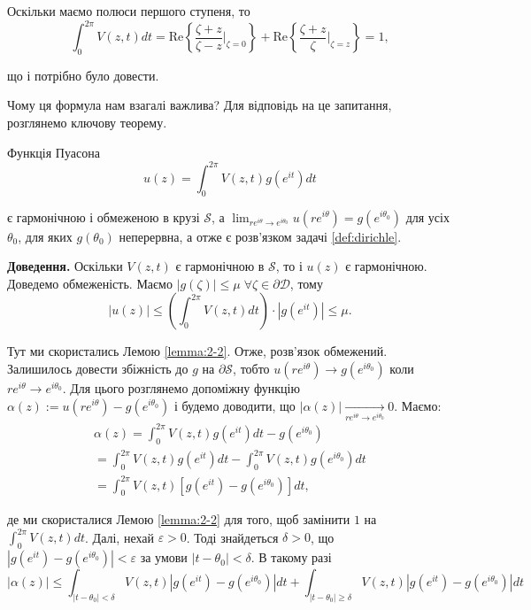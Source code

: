 \documentclass[14pt]{extarticle}
\newcommand{\<}{\langle}
\renewcommand{\>}{\rangle}
\theoremstyle{mystyle}{\newtheorem{definition}{Definition}[section]}
\theoremstyle{mystyle}{\newtheorem{proposition}[definition]{Proposition}}
\theoremstyle{mystyle}{\newtheorem{theorem}[definition]{Theorem}}
\theoremstyle{mystyle}{\newtheorem{lemma}[definition]{Lemma}}
\theoremstyle{mystyle}{\newtheorem{corollary}[definition]{Corollary}}
\theoremstyle{mystyle}{\newtheorem*{remark}{Remark}}
\theoremstyle{mystyle}{\newtheorem*{remarks}{Remarks}}
\theoremstyle{mystyle}{\newtheorem*{example}{Example}}
\theoremstyle{mystyle}{\newtheorem*{examples}{Examples}}
\theoremstyle{definition}{\newtheorem*{exercise}{Exercise}}
\theoremstyle{cstyle}{\newtheorem*{cthm}{}}
\theoremstyle{warn}
\begin{document}
Оскільки маємо полюси першого ступеня, то
\begin{equation}
    \int_0^{2\pi}V(z,t)dt = \text{Re}\left\{\frac{\zeta+z}{\zeta-z}\Big|_{\zeta=0}\right\} + \text{Re}\left\{\frac{\zeta+z}{\zeta}\Big|_{\zeta=z}\right\} = 1,
\end{equation}

що і потрібно було довести.

Чому ця формула нам взагалі важлива? Для відповідь на це запитання, розглянемо ключову теорему.

\begin{theorem}
    Функція Пуасона
    \begin{equation}
        u(z) = \int_0^{2\pi}V(z,t)g(e^{it})dt
    \end{equation}

    є гармонічною і обмеженою в крузі $\mathcal{S}$, а $\lim_{re^{i\theta} \to e^{i\theta_0}}u(re^{i\theta})=g(e^{i\theta_0})$ для усіх $\theta_0$, для яких $g(\theta_0)$ неперервна, а отже є розв'язком задачі \ref{def:dirichle}.
\end{theorem}

\textbf{Доведення.} Оскільки $V(z,t)$ є гармонічною в $\mathcal{S}$, то і $u(z)$ є гармонічною. Доведемо обмеженість. Маємо $|g(\zeta)|\leq \mu \; \forall \zeta \in \partial\mathcal{D}$, тому
\begin{equation}
    |u(z)| \leq \left(\int_0^{2\pi}V(z,t)dt\right) \cdot |g(e^{it})| \leq \mu.
\end{equation}

Тут ми скористались Лемою \ref{lemma:2-2}. Отже, розв'язок обмежений. Залишилось довести збіжність до $g$ на $\partial\mathcal{S}$, тобто $u(re^{i\theta}) \to g(e^{i\theta_0})$ коли $re^{i\theta} \to e^{i\theta_0}$. Для цього розглянемо допоміжну функцію $\alpha(z) := u(re^{i\theta})-g(e^{i\theta_0})$ і будемо доводити, що $|\alpha(z)| \xrightarrow[re^{i\theta} \to e^{i\theta_0}]{} 0$. Маємо:
\begin{gather}
    \alpha(z) = \int_0^{2\pi}V(z,t)g(e^{it})dt - g(e^{i\theta_0}) \nonumber \\
    = \int_0^{2\pi}V(z,t)g(e^{it})dt - \int_0^{2\pi}V(z,t)g(e^{i\theta_0})dt \nonumber \\
    = \int_0^{2\pi}V(z,t)[g(e^{it})-g(e^{i\theta_0})]dt,
\end{gather}

де ми скористалися Лемою \ref{lemma:2-2} для того, щоб замінити $1$ на $\int_0^{2\pi}V(z,t)dt$. Далі, нехай $\varepsilon>0$. Тоді знайдеться $\delta>0$, що $|g(e^{it})-g(e^{i\theta_0})|<\varepsilon$ за умови $|t-\theta_0|<\delta$. В такому разі
\begin{equation*}
    |\alpha(z)| \leq \int_{|t-\theta_0|<\delta}V(z,t)|g(e^{it})-g(e^{i\theta_0})|dt + \int_{|t-\theta_0|\geq\delta}V(z,t)|g(e^{it})-g(e^{i\theta_0})|dt
\end{equation*}
\end{document}
